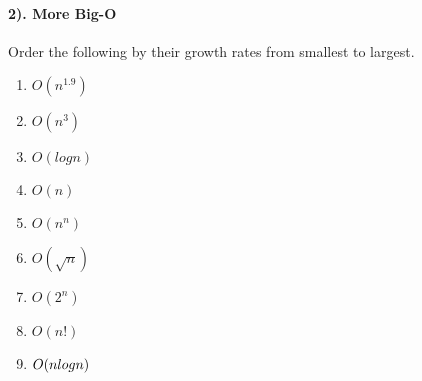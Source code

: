 \documentclass{article}
\begin{document}
\paragraph{2). More Big-O}
Order the following by their growth rates from smallest to largest.
\begin{enumerate}
\item\begin{math}
	O(n^{1.9})
\end{math}

\item\begin{math}
O(n^{3})
\end{math}

\item\begin{math}
O(log n)
\end{math}

\item\begin{math}
O(n)
\end{math}

\item\begin{math}
O(n^{n})
\end{math}

\item\begin{math}
O(\sqrt{n})
\end{math}

\item\begin{math}
O(2^{n})
\end{math}

\item\begin{math}
O(n!)
\end{math}

\item\begin{math}
O(n log n)\\\\
\end{math}
\end{enumerate}
\end{document}
